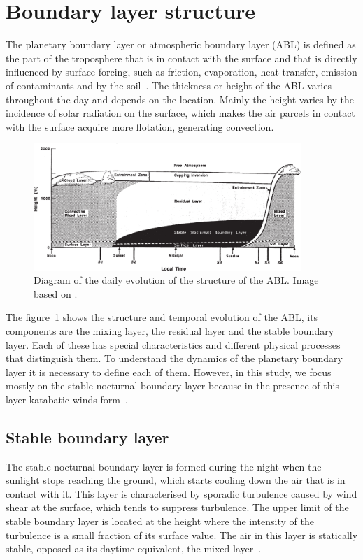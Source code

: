 \section{Boundary layer structure}
The planetary boundary layer or atmospheric boundary layer (ABL) is defined as the part of the troposphere that is in contact with the surface and that is directly influenced by surface forcing, such as friction, evaporation, heat transfer, emission of contaminants and by the soil~\citep{stull2012introduction}. The thickness or height of the ABL varies throughout the day and depends on the location. Mainly the height varies by the incidence of solar radiation on the surface, which makes the air parcels in contact with the surface acquire more flotation, generating convection.

\begin{figure}[ht!]
	\vspace{-5pt}
    \centering
\includegraphics[width=0.9\textwidth]{fig/chapter_2/abl_stull.png}
    \caption{Diagram of the daily evolution of the structure of the ABL. Image based on \cite{stull2012introduction}.}
    \label{fig:ABL_structure}
  \vspace{-5pt}
\end{figure}

The figure~\ref{fig:ABL_structure} shows the structure and temporal evolution of the ABL, its components are the mixing layer, the residual layer and the stable boundary layer. Each of these has special characteristics and different physical processes that distinguish them. To understand the dynamics of the planetary boundary layer it is necessary to define each of them. However, in this study, we focus mostly on the stable nocturnal boundary layer because in the presence of this layer katabatic winds form~\citep{poulos2008observational, stull2012introduction}.

\subsection{Stable boundary layer}
The stable nocturnal boundary layer is formed during the night when the sunlight stops reaching the ground, which starts cooling down the air that is in contact with it. This layer is characterised by sporadic turbulence caused by wind shear at the surface, which tends to suppress turbulence. The upper limit of the stable boundary layer is located at the height where the intensity of the turbulence is a small fraction of its surface value. The air in this layer is statically stable, opposed as its daytime equivalent, the mixed layer~\citep{stull2012introduction}.

